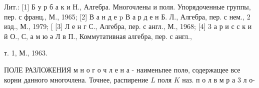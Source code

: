 \documentclass[10pt]{article}
\begin{document}
Лит.: [1] Б у р б а к и Н., Алгебра. Многочлены и поля. Упорядоченные группы, пер. с франц., М., 1965; [2] В а н д е p В а р д е н Б. Л., Алгебра, пер. с нем., 2 изд., М., 1979; [ [3] Л е н г С., Алгебра, пер. с англ., М., 1968; [4] 3 а р и с с к и й О., С, а м ю ә Л в П., Коммутативная алгебра, пер. с англ.,

т. 1, М., 1963.



ПОЛЕ РАЗЛОЖЕНИЯ м н о г о ч л е н а - наименьпее полө, содержащее все корни данного многочлена. Точнее, распирение $L$ поля $K$ наз. п о л в м р а 3 л о-
\end{document}

